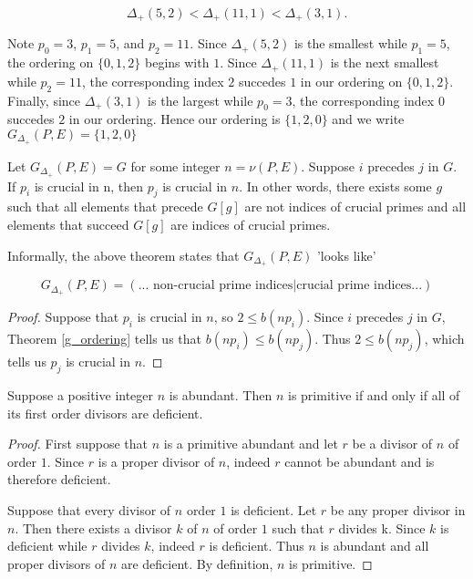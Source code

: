 \documentclass[../paper.tex]{subfiles}
\begin{document}
$$\Delta_{+}(5,2) < \Delta_{+}(11,1) < \Delta_{+}(3,1).$$

Note $p_0 = 3$, $p_1 = 5$, and $p_2 = 11$. Since $\Delta_+(5,2)$
is the smallest while $p_1 = 5$, the ordering on $\{0, 1, 2\}$
begins with $1$. Since $\Delta_+(11,1)$ is the next smallest while
$p_2 = 11$, the corresponding index $2$ succedes $1$ in our
ordering on $\{0,1,2\}$. Finally, since $\Delta_+(3,1)$ is the largest
while $p_0 = 3$, the corresponding index $0$ succedes $2$ in our
ordering. Hence our ordering is $\{1, 2, 0\}$ and we write 
$G_{\Delta_+}(P,E) = \{1, 2, 0\}$ 

\begin{theorem}\label{crucial_thm}
Let $G_{\Delta_+}(P,E) = G$ for some integer $n = \nu (P,E)$.
Suppose $i$ precedes $j$ in $G$. If $p_i$ is crucial in n,
then $p_j$ is crucial in $n$. In other words, there exists some $g$
such that all elements that precede $G[g]$ are not indices of
crucial primes and all elements that succeed $G[g]$ are indices of
crucial primes.
\end{theorem}

Informally, the above theorem states that $G_{\Delta_+}(P,E)$ 'looks like'

$$ G_{\Delta_+}(P, E) = (\text{... non-crucial prime indices} 
                        | \text{crucial prime indices...}) $$

\begin{proof}

Suppose that
$p_i$ is crucial in $n$, so $2 \leq b(n p_i)$. Since $i$ precedes 
$j$ in $G$, Theorem {\ref{g_ordering}} tells us that $b(n p_i) \leq b(n
p_j)$. Thus $2 \leq b(n p_j)$, which tells us $p_j$ is crucial in $n$.

\end{proof}


\begin{theorem}\label{del_minus_thm}
Suppose a positive integer $n$ is abundant. Then $n$ is primitive if and 
only if all of its first order divisors are deficient.
\end{theorem}

\begin{proof}
	First suppose that $n$ is a primitive abundant and let $r$ be a
divisor of $n$ of order $1$. Since $r$ is a proper divisor of $n$,
indeed $r$ cannot be abundant and is therefore deficient.

	Suppose that every divisor of $n$ order $1$ is deficient. Let 
$r$ be any proper divisor in $n$. Then there exists a divisor $k$ 
of $n$ of order $1$ such that $r$ divides k. Since $k$ is 
deficient while $r$ divides $k$, indeed $r$ is deficient. Thus $n$
is abundant and all proper divisors of $n$ are deficient. By 
definition, $n$ is primitive. 
\end{proof}
\end{document}
